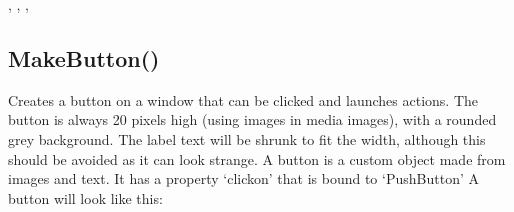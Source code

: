 \documentclass[letterpaper,10pt,english]{sphinxmanual}
\begin{document}
\sphinxAtStartPar
{}

\begin{sphinxVerbatim}[commandchars=\\\{\}]
\end{sphinxVerbatim}

\sphinxAtStartPar
{}

\begin{sphinxVerbatim}[commandchars=\\\{\}]
\PYG{p}{[}\PYG{p}{]}

\PYG{p}{[}\PYG{p}{]}
\end{sphinxVerbatim}

\sphinxAtStartPar
{}

\sphinxAtStartPar
{}, , , 

\ignorespaces 

\subsection{MakeButton()}
\label{\detokenize{reference/ui:makebutton}}\label{\detokenize{reference/ui:index-13}}
\sphinxAtStartPar
{}

\sphinxAtStartPar
{}

\sphinxAtStartPar
Creates a button on a window that can be clicked and launches actions. The button is always 20 pixels high (using images in media images), with a rounded grey background.  The label text will be shrunk to fit the width, although this should be avoided as it can look strange. A button is a custom object made from images and text. It has a property ‘clickon’ that is bound to ‘PushButton’  A button will look like this: 
\end{document}
